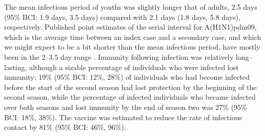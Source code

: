 The mean infectious period of youths was slightly longer that of adults, 2.5 days (95\% BCI: 1.9 days, 3.5 days) compared with 2.1 days (1.8 days, 5.8 days), respectively. Published point estimates of the serial interval for A(H1N1)pdm09, which is the average time between an index case and a secondary case, and which we might expect to be a bit shorter than the mean infectious period, have mostly been in the 2--3.5 day range \cite{vink2014serial}. Immunity following infection was relatively long--lasting, although a sizable percentage of individuals who were infected lost immunity; 19\% (95\% BCI: 12\%, 28\%) of individuals who had become infected before the start of the second season had lost protection by the beginning of the second season, while the percentage of infected individuals who became infected over both seasons and lost immunity by the end of season two was 27\% (95\% BCI: 18\%, 38\%). The vaccine was estimated to reduce the rate of infectious contact by 81\% (95\% BCI: 46\%, 96\%). 

